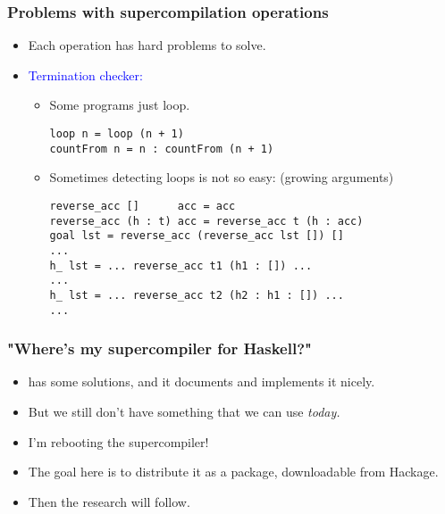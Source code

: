 \documentclass{beamer}
\begin{document}
\begin{frame}[fragile]
    \frametitle{Problems with supercompilation operations}

    \begin{itemize}

        \item[]
            Each operation has hard problems to solve.

        \item[]
            \textcolor{blue}{Termination checker:}

            \begin{itemize}[<+(1)->]

                \item[]
                    Some programs just loop.

                    \begin{verbatim}
loop n = loop (n + 1)
countFrom n = n : countFrom (n + 1)
                    \end{verbatim}

                \item[]
                    Sometimes detecting loops is not so easy: (growing
                    arguments)

                    \begin{verbatim}
reverse_acc []      acc = acc
reverse_acc (h : t) acc = reverse_acc t (h : acc)
goal lst = reverse_acc (reverse_acc lst []) []
...
h_ lst = ... reverse_acc t1 (h1 : []) ...
...
h_ lst = ... reverse_acc t2 (h2 : h1 : []) ...
...
                    \end{verbatim}

            \end{itemize}

    \end{itemize}
\end{frame}

\begin{frame}
    \frametitle{"Where's my supercompiler for Haskell?"}

    \begin{itemize}[<+->]
        \item
            \citet{callbyneed-sc} has some solutions, and it documents and
            implements it nicely.

        \item
            But we still don't have something that we can use \textit{today.}

        \item
            I'm rebooting the supercompiler!

        \item
            The goal here is to distribute it as a package, downloadable from
            Hackage.

        \item
            Then the research will follow.
    \end{itemize}
\end{frame}
\end{document}
